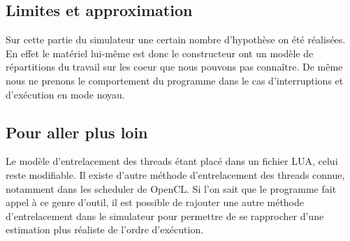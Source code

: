 \subsection{Limites et approximation}
Sur cette partie du simulateur une certain nombre d'hypothèse on été réalisées. En effet le matériel lui-même est donc le constructeur ont un modèle de répartitions du travail sur les coeur que nous pouvons pas connaître. De même nous ne prenons le comportement du programme dans le cas d'interruptions et d'exécution en mode noyau.

\subsection{Pour aller plus loin}
Le modèle d'entrelacement des threads étant placé dans un fichier LUA, celui reste modifiable. Il existe d'autre méthode d'entrelacement des threads connue, notamment dans les scheduler de OpenCL. Si l'on sait que le programme fait appel à ce genre d'outil, il est possible de rajouter une autre méthode d'entrelacement dans le simulateur pour permettre de se rapprocher d'une estimation plus réaliste de l'ordre d'exécution.

